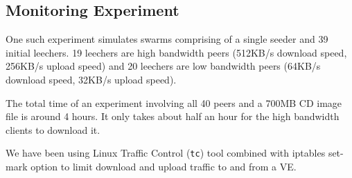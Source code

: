 \subsection{Monitoring Experiment}

One such experiment simulates swarms comprising of a single seeder and 39
initial leechers. 19 leechers are high bandwidth peers (512KB/s download
speed, 256KB/s upload speed) and 20 leechers are low bandwidth peers (64KB/s
download speed, 32KB/s upload speed).

The total time of an experiment involving all 40 peers and a 700MB CD image
file is around 4 hours. It only takes about half an hour for the high
bandwidth clients to download it.

We have been using Linux Traffic Control (\texttt{tc}) tool combined with
iptables set-mark option to limit download and upload traffic to and from a
VE.

